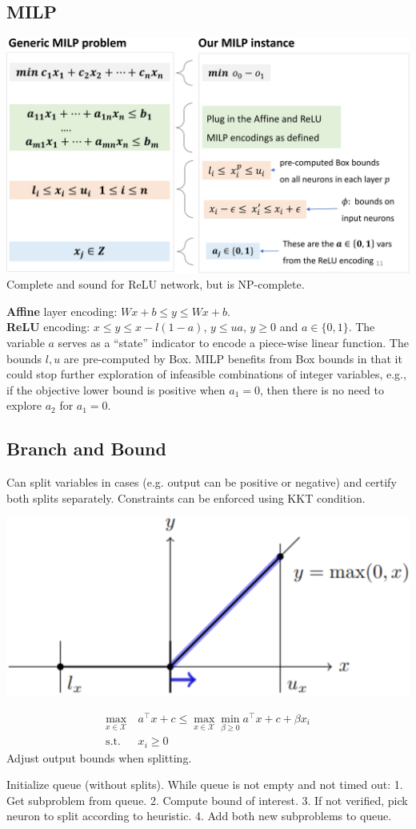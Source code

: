 \subsection*{MILP}
\includegraphics[width=1\linewidth]{img/milp.png}
Complete and sound for ReLU network, but is NP-complete.

\textbf{Affine} layer encoding: $Wx+b\le y\le Wx+b$.\\
\textbf{ReLU} encoding: $x\leq y\leq x-l(1-a)$,  $y\le ua$, $y\ge 0$ and $a\in\{0,1\}$. The variable $a$ serves as a ``state'' indicator to encode a piece-wise linear function. The bounds $l,u$ are pre-computed by Box. MILP benefits from Box bounds in that it could stop further exploration of infeasible combinations of integer variables, e.g., if the objective lower bound is positive when $a_1=0$, then there is no need to explore $a_2$ for $a_1=0$.

\subsection*{Branch and Bound}
Can split variables in cases (e.g.  output can be positive or negative) and certify both splits separately. Constraints can be enforced using KKT condition.
\begin{center}
    \includegraphics[width=.6\linewidth]{img/bnb.png}
\end{center}
\begin{equation*}
    \begin{split}
        \max_{x\in\mathcal{X}} \  &a^\top x+c\leq \max_{x\in\mathcal{X}}\min_{\beta\geq0}a^\top x+c+\beta x_i \\[-2mm]
        \text{s.t.} \ \ \        &  x_i\geq0
    \end{split}
\end{equation*}
\Warning Adjust output bounds when splitting.

Initialize queue (without splits). While queue is not empty and not timed out:
1. Get subproblem from queue.
2. Compute bound of interest.
3. If not verified, pick neuron to split according to heuristic.
4. Add both new subproblems to queue.
